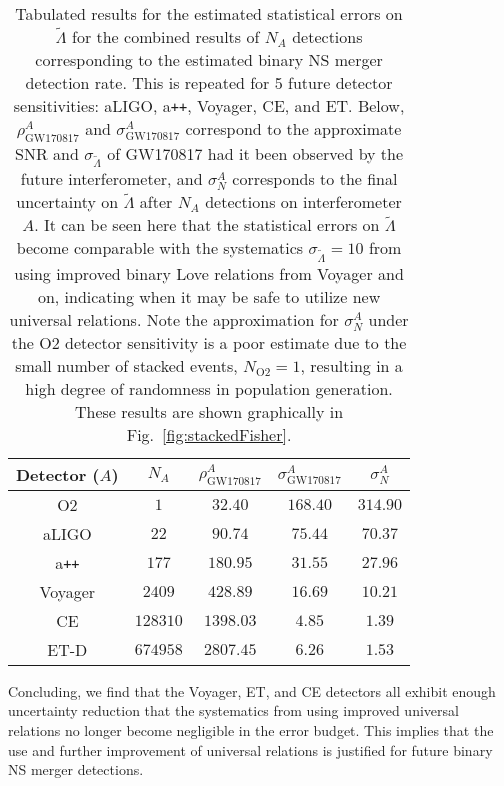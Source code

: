\documentclass[prd,twocolumn,nofootinbib,superscriptaddress,amsmath,amssymb]{revtex4-1}
\begin{document}
\begin{table}[ht!]
\centering
\caption{
Tabulated results for the estimated statistical errors on $\tilde{\Lambda}$ for the combined results of $N_A$ detections corresponding to the estimated binary NS merger detection rate.
This is repeated for 5 future detector sensitivities: aLIGO, a\texttt{++}, Voyager, CE, and ET.
Below, $\rho^A_{\text{GW170817}}$ and $\sigma^A_{\text{GW170817}}$ correspond to the approximate SNR and $\sigma_{\tilde{\Lambda}}$ of GW170817 had it been observed by the future interferometer, and $\sigma^A_N$ corresponds to the final uncertainty on $\tilde{\Lambda}$ after $N_A$ detections on interferometer $A$.
It can be seen here that the statistical errors on $\tilde{\Lambda}$ become comparable with the systematics $\sigma_{\tilde{\Lambda}}=10$ from using improved binary Love relations from Voyager and on, indicating when it may be safe to utilize new universal relations.
Note the approximation for $\sigma^A_N$ under the O2 detector sensitivity is a poor estimate due to the small number of stacked events, $N_{\text{O2}}=1$, resulting in a high degree of randomness in population generation.
These results are shown graphically in Fig.~\ref{fig:stackedFisher}.
}\label{tab:variances}
\begin{tabular}{ c || c  c  c c } 
\hline
Detector ($A$) & $N_A$ & $\rho^A_{\text{GW170817}}$ & $\sigma^A_{\text{GW170817}}$ & $\sigma^A_N$\\
\hline
\hline
O2 & $1$ & $32.40$ & $168.40$ & $314.90$\\
aLIGO & $22$ & $90.74$ & $75.44$ & $70.37$\\
a\texttt{++} & $177$ & $180.95$ & $31.55$ & $27.96$\\
Voyager & $2409$ & $428.89$ & $16.69$ & $10.21$\\
CE & $128310$ & $1398.03$ & $4.85$ & $1.39$\\
ET-D & $674958$ & $2807.45$ & $6.26$ & $1.53$\\
\hline
\end{tabular}
\end{table}

Concluding, we find that the Voyager, ET, and CE detectors all exhibit enough uncertainty reduction that the systematics from using improved universal relations no longer become negligible in the error budget.
This implies that the use and further improvement of universal relations is justified for future binary NS merger detections.

\end{document}

